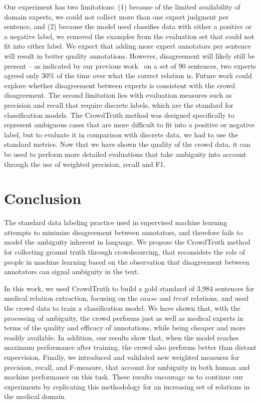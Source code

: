 Our experiment has two limitations: (1) because of the limited availability of domain experts, we could not collect more than one expert judgment per sentence, and (2) because the model used classifies data with either a positive or a negative label, we removed the examples from the evaluation set that could not fit into either label.  We expect that adding more expert annotators per sentence will result in better quality annotations. However, disagreement will likely still be present -- as indicated by our previous work~\cite{aroyo2013crowd} on a set of 90 sentences, two experts agreed only 30\% of the time over what the correct relation is. Future work could explore whether disagreement between experts is consistent with the crowd disagreement. The second limitation lies with evaluation measures such as precision and recall that require discrete labels, which are the standard for classification models. The CrowdTruth method was designed specifically to represent ambiguous cases that are more difficult to fit into a positive or negative label, but to evaluate it in comparison with discrete data, we had to use the standard metrics. Now that we have shown the quality of the crowd data, it can be used to perform more detailed evaluations that take ambiguity into account through the use of weighted precision, recall and F1.


\section{Conclusion}

The standard data labeling practice used in supervised machine learning attempts to minimize disagreement between annotators, and therefore fails to model the ambiguity inherent in language. We propose the CrowdTruth method for collecting ground truth through crowdsourcing, that reconsiders the role of people in machine learning based on the observation that disagreement between annotators can signal ambiguity in the text.

In this work, we used CrowdTruth to build a gold standard of 3,984 sentences for medical relation extraction, focusing on the $cause$ and $treat$ relations, and used the crowd data to train a classification model. We have shown that, with the processing of ambiguity, the crowd performs just as well as medical experts in terms of the quality and efficacy of annotations, while being cheaper and more readily available. In addition, our results show that, when the model reaches maximum performance after training, the crowd also performs better than distant supervision. Finally, we introduced and validated new weighted measures for precision, recall, and F-measure, that account for ambiguity in both human and machine performance on this task. These results encourage us to continue our experiments by replicating this methodology for an increasing set of relations in the medical domain.


